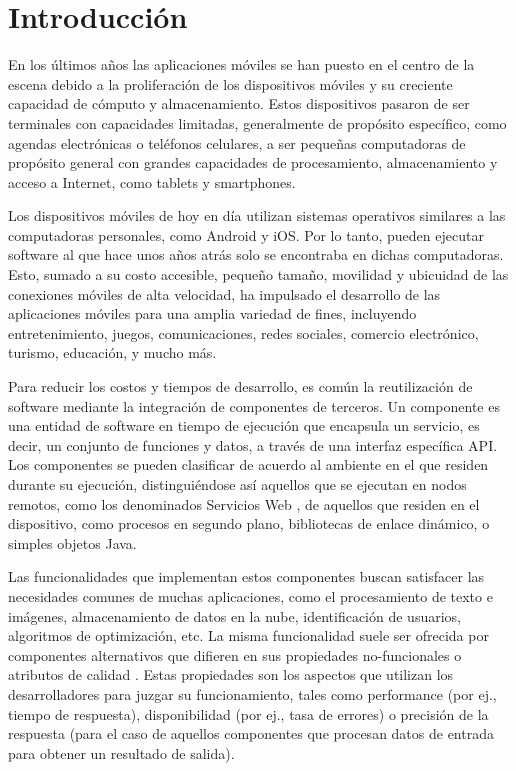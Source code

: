 
\chapter{Introducción}

En los últimos años las aplicaciones móviles se han puesto en el centro
de la escena debido a la proliferación de los dispositivos móviles
y su creciente capacidad de cómputo y almacenamiento\cite{Zunino2011}.
Estos dispositivos pasaron de ser terminales con capacidades limitadas,
generalmente de propósito específico, como agendas electrónicas o
teléfonos celulares, a ser pequeñas computadoras de propósito general
con grandes capacidades de procesamiento, almacenamiento y acceso
a Internet, como tablets y smartphones. 

Los dispositivos móviles de hoy en día utilizan sistemas operativos
similares a las computadoras personales, como Android y iOS. Por lo
tanto, pueden ejecutar software al que hace unos años atrás solo se
encontraba en dichas computadoras. Esto, sumado a su costo accesible,
pequeño tamaño, movilidad y ubicuidad de las conexiones móviles de
alta velocidad, ha impulsado el desarrollo de las aplicaciones móviles
para una amplia variedad de fines, incluyendo entretenimiento, juegos,
comunicaciones, redes sociales, comercio electrónico, turismo, educación,
y mucho más. 

Para reducir los costos y tiempos de desarrollo, es común la reutilización
de software mediante la integración de componentes de terceros. Un
componente\cite{Petritsch2016} es una entidad de software en tiempo
de ejecución que encapsula un servicio, es decir, un conjunto de funciones
y datos, a través de una interfaz específica \ac{API}. Los componentes
se pueden clasificar de acuerdo al ambiente en el que residen durante
su ejecución, distinguiéndose así aquellos que se ejecutan en nodos
remotos, como los denominados Servicios Web \cite{Erickson2009},
de aquellos que residen en el dispositivo, como procesos en segundo
plano, bibliotecas de enlace dinámico, o simples objetos Java. 

Las funcionalidades que implementan estos componentes buscan satisfacer
las necesidades comunes de muchas aplicaciones, como el procesamiento
de texto e imágenes, almacenamiento de datos en la nube, identificación
de usuarios, algoritmos de optimización, etc. La misma funcionalidad
suele ser ofrecida por componentes alternativos que difieren en sus
propiedades no-funcionales o atributos de calidad \cite{Addison2003}.
Estas propiedades son los aspectos que utilizan los desarrolladores
para juzgar su funcionamiento, tales como performance (por ej., tiempo
de respuesta), disponibilidad (por ej., tasa de errores) o precisión
de la respuesta (para el caso de aquellos componentes que procesan
datos de entrada para obtener un resultado de salida). 

